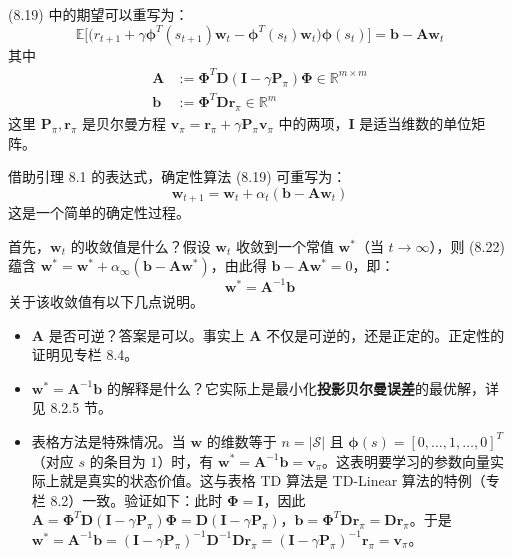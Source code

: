 \documentclass[UTF8]{article}
\begin{document}
\begin{theorembox}[8.1]
(8.19) 中的期望可以重写为：
\[
\mathbb{E}\Big[\big(r_{t+1} + \gamma \boldsymbol{\phi}^T(s_{t+1})\boldsymbol{w}_t - \boldsymbol{\phi}^T(s_t)\boldsymbol{w}_t\big) \boldsymbol{\phi}(s_t)\Big] = \boldsymbol{b} - \boldsymbol{A}\boldsymbol{w}_t
\]
其中
\begin{align}
\label{eq:A_b}
\boldsymbol{A} &:= \boldsymbol{\Phi}^T \boldsymbol{D} (\boldsymbol{I} - \gamma \boldsymbol{P}_\pi) \boldsymbol{\Phi} \in \mathbb{R}^{m \times m} \\
\boldsymbol{b} &:= \boldsymbol{\Phi}^T \boldsymbol{D} \boldsymbol{r}_\pi \in \mathbb{R}^{m}
\end{align}
这里 $\boldsymbol{P}_\pi, \boldsymbol{r}_\pi$ 是贝尔曼方程 $\boldsymbol{v}_\pi = \boldsymbol{r}_\pi + \gamma \boldsymbol{P}_\pi \boldsymbol{v}_\pi$ 中的两项，$\boldsymbol{I}$ 是适当维数的单位矩阵。
\end{theorembox}

借助引理 8.1 的表达式，确定性算法 (8.19) 可重写为：
\begin{equation}
\label{eq:det_td_simple}
\boldsymbol{w}_{t+1} = \boldsymbol{w}_t + \alpha_t (\boldsymbol{b} - \boldsymbol{A}\boldsymbol{w}_t)
\end{equation}
这是一个简单的确定性过程。

首先，$\boldsymbol{w}_t$ 的收敛值是什么？假设 $\boldsymbol{w}_t$ 收敛到一个常值 $\boldsymbol{w}^*$（当 $t \to \infty$），则 (8.22) 蕴含 $\boldsymbol{w}^* = \boldsymbol{w}^* + \alpha_\infty(\boldsymbol{b} - \boldsymbol{A}\boldsymbol{w}^*)$，由此得 $\boldsymbol{b} - \boldsymbol{A}\boldsymbol{w}^* = 0$，即：
\[
\boldsymbol{w}^* = \boldsymbol{A}^{-1} \boldsymbol{b}
\]
关于该收敛值有以下几点说明。

\begin{itemize}
    \item $\boldsymbol{A}$ 是否可逆？答案是可以。事实上 $\boldsymbol{A}$ 不仅是可逆的，还是正定的。正定性的证明见专栏 8.4。
    
    \item $\boldsymbol{w}^* = \boldsymbol{A}^{-1}\boldsymbol{b}$ 的解释是什么？它实际上是最小化\textbf{投影贝尔曼误差}的最优解，详见 8.2.5 节。
    
    \item 表格方法是特殊情况。当 $\boldsymbol{w}$ 的维数等于 $n = |\mathcal{S}|$ 且 $\boldsymbol{\phi}(s) = [0, \dots, 1, \dots, 0]^T$（对应 $s$ 的条目为 $1$）时，有 $\boldsymbol{w}^* = \boldsymbol{A}^{-1}\boldsymbol{b} = \boldsymbol{v}_\pi$。这表明要学习的参数向量实际上就是真实的状态价值。这与表格 TD 算法是 TD-Linear 算法的特例（专栏 8.2）一致。验证如下：此时 $\boldsymbol{\Phi} = \boldsymbol{I}$，因此 $\boldsymbol{A} = \boldsymbol{\Phi}^T\boldsymbol{D}(\boldsymbol{I} - \gamma\boldsymbol{P}_\pi)\boldsymbol{\Phi} = \boldsymbol{D}(\boldsymbol{I} - \gamma\boldsymbol{P}_\pi)$，$\boldsymbol{b} = \boldsymbol{\Phi}^T\boldsymbol{D}\boldsymbol{r}_\pi = \boldsymbol{D}\boldsymbol{r}_\pi$。于是 $\boldsymbol{w}^* = \boldsymbol{A}^{-1}\boldsymbol{b} = (\boldsymbol{I} - \gamma\boldsymbol{P}_\pi)^{-1}\boldsymbol{D}^{-1}\boldsymbol{D}\boldsymbol{r}_\pi = (\boldsymbol{I} - \gamma\boldsymbol{P}_\pi)^{-1}\boldsymbol{r}_\pi = \boldsymbol{v}_\pi$。
\end{itemize}
\end{document}
